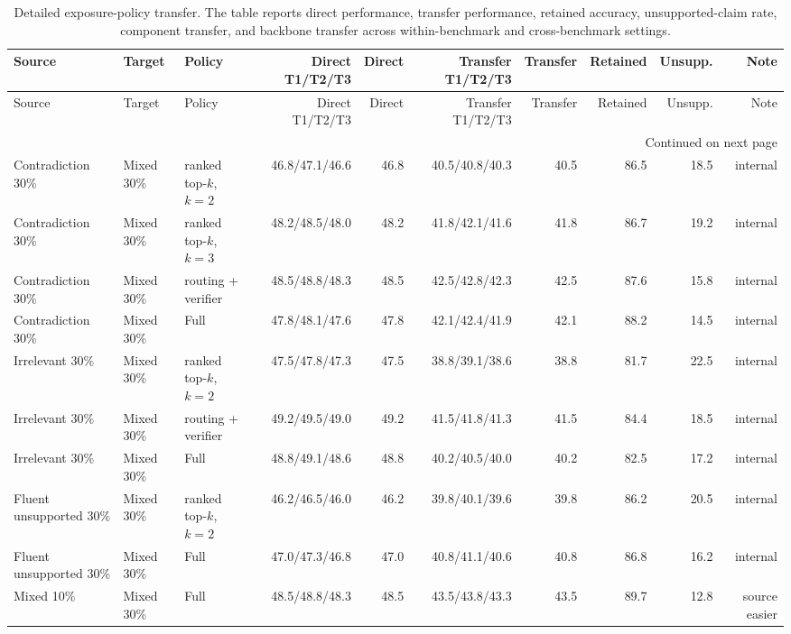 \begingroup
\scriptsize
\setlength{\tabcolsep}{2.2pt}
\setlength{\LTleft}{\fill}
\setlength{\LTright}{\fill}
\begin{longtable}{lllrrrrrrr}
\caption{Detailed exposure-policy transfer. The table reports direct performance, transfer performance, retained accuracy, unsupported-claim rate, component transfer, and backbone transfer across within-benchmark and cross-benchmark settings.}\label{tab:transfer-detailed}\\
\toprule
Source & Target & Policy & Direct T1/T2/T3 & Direct & Transfer T1/T2/T3 & Transfer & Retained & Unsupp. & Note \\
\midrule
\endfirsthead
\toprule
Source & Target & Policy & Direct T1/T2/T3 & Direct & Transfer T1/T2/T3 & Transfer & Retained & Unsupp. & Note \\
\midrule
\endhead
\midrule
\multicolumn{10}{r}{\scriptsize Continued on next page}\\
\endfoot
\bottomrule
\endlastfoot
Contradiction 30\% & Mixed 30\% & ranked top-$k$, $k=2$ & 46.8/47.1/46.6 & 46.8 & 40.5/40.8/40.3 & 40.5 & 86.5 & 18.5 & internal \\
Contradiction 30\% & Mixed 30\% & ranked top-$k$, $k=3$ & 48.2/48.5/48.0 & 48.2 & 41.8/42.1/41.6 & 41.8 & 86.7 & 19.2 & internal \\
Contradiction 30\% & Mixed 30\% & \method{} routing + verifier & 48.5/48.8/48.3 & 48.5 & 42.5/42.8/42.3 & 42.5 & 87.6 & 15.8 & internal \\
\rowcolor{tracesoft}
Contradiction 30\% & Mixed 30\% & \method{} Full & 47.8/48.1/47.6 & 47.8 & 42.1/42.4/41.9 & 42.1 & 88.2 & 14.5 & internal \\
Irrelevant 30\% & Mixed 30\% & ranked top-$k$, $k=2$ & 47.5/47.8/47.3 & 47.5 & 38.8/39.1/38.6 & 38.8 & 81.7 & 22.5 & internal \\
Irrelevant 30\% & Mixed 30\% & \method{} routing + verifier & 49.2/49.5/49.0 & 49.2 & 41.5/41.8/41.3 & 41.5 & 84.4 & 18.5 & internal \\
Irrelevant 30\% & Mixed 30\% & \method{} Full & 48.8/49.1/48.6 & 48.8 & 40.2/40.5/40.0 & 40.2 & 82.5 & 17.2 & internal \\
Fluent unsupported 30\% & Mixed 30\% & ranked top-$k$, $k=2$ & 46.2/46.5/46.0 & 46.2 & 39.8/40.1/39.6 & 39.8 & 86.2 & 20.5 & internal \\
Fluent unsupported 30\% & Mixed 30\% & \method{} Full & 47.0/47.3/46.8 & 47.0 & 40.8/41.1/40.6 & 40.8 & 86.8 & 16.2 & internal \\
Mixed 10\% & Mixed 30\% & \method{} Full & 48.5/48.8/48.3 & 48.5 & 43.5/43.8/43.3 & 43.5 & 89.7 & 12.8 & source easier \\

\end{longtable}
